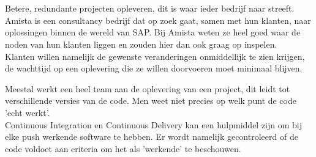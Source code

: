 
%
%

%



\chapter*{}
Betere, redundante projecten opleveren, dit is waar ieder bedrijf naar streeft.\\
Amista is een consultancy bedrijf dat op zoek gaat, samen met hun klanten, naar oplossingen binnen de wereld van SAP.
Bij Amista weten ze heel goed waar de noden van hun klanten liggen en zouden hier dan ook graag op inspelen.\\
Klanten willen namelijk de gewenste veranderingen onmiddellijk te zien krijgen, de wachttijd op een oplevering die ze willen doorvoeren moet minimaal blijven.

Meestal werkt een heel team aan de oplevering van een project, dit leidt tot verschillende versies van de code. Men weet niet precies op welk punt de code 'echt werkt'. \\
Continuous Integration en Continuous Delivery kan een hulpmiddel zijn om bij elke push werkende software te hebben. Er wordt namelijk gecontroleerd of de code voldoet aan criteria om het als 'werkende' te beschouwen.

